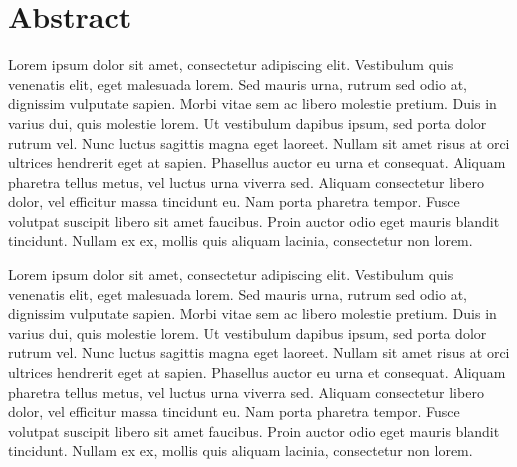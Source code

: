 \chapter{Abstract}
Lorem ipsum dolor sit amet, consectetur adipiscing elit. Vestibulum quis venenatis elit, eget malesuada lorem. Sed mauris urna, rutrum sed odio at, dignissim vulputate sapien. Morbi vitae sem ac libero molestie pretium. Duis in varius dui, quis molestie lorem. Ut vestibulum dapibus ipsum, sed porta dolor rutrum vel. Nunc luctus sagittis magna eget laoreet. Nullam sit amet risus at orci ultrices hendrerit eget at sapien. Phasellus auctor eu urna et consequat. Aliquam pharetra tellus metus, vel luctus urna viverra sed. Aliquam consectetur libero dolor, vel efficitur massa tincidunt eu. Nam porta pharetra tempor. Fusce volutpat suscipit libero sit amet faucibus. Proin auctor odio eget mauris blandit tincidunt. Nullam ex ex, mollis quis aliquam lacinia, consectetur non lorem. 

Lorem ipsum dolor sit amet, consectetur adipiscing elit. Vestibulum quis venenatis elit, eget malesuada lorem. Sed mauris urna, rutrum sed odio at, dignissim vulputate sapien. Morbi vitae sem ac libero molestie pretium. Duis in varius dui, quis molestie lorem. Ut vestibulum dapibus ipsum, sed porta dolor rutrum vel. Nunc luctus sagittis magna eget laoreet. Nullam sit amet risus at orci ultrices hendrerit eget at sapien. Phasellus auctor eu urna et consequat. Aliquam pharetra tellus metus, vel luctus urna viverra sed. Aliquam consectetur libero dolor, vel efficitur massa tincidunt eu. Nam porta pharetra tempor. Fusce volutpat suscipit libero sit amet faucibus. Proin auctor odio eget mauris blandit tincidunt. Nullam ex ex, mollis quis aliquam lacinia, consectetur non lorem. 